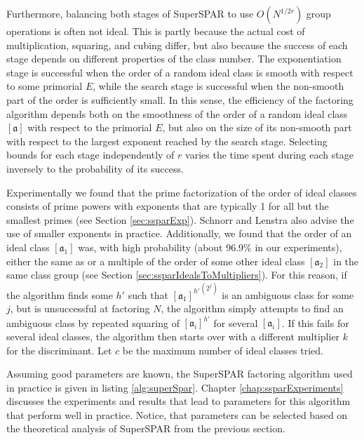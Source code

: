 \documentclass{ucalgthes1}
\theoremstyle{definition}
\newcommand{\aclass}{[\mathfrak a]}
\begin{document}
Furthermore, balancing both stages of SuperSPAR to use $O(N^{1/2r})$ group operations is often not ideal.  This is partly because the actual cost of multiplication, squaring, and cubing differ, but also because the success of each stage depends on different properties of the class number.  The exponentiation stage is successful when the order of a random ideal class is smooth with respect to some primorial $E$, while the search stage is successful when the non-smooth part of the order is sufficiently small.  In this sense, the efficiency of the factoring algorithm depends both on the smoothness of the order of a random ideal class $\aclass$ with respect to the primorial $E$, but also on the size of its non-smooth part with respect to the largest exponent reached by the search stage.  Selecting bounds for each stage independently of $r$ varies the time spent during each stage inversely to the probability of its success.

Experimentally we found that the prime factorization of the order of ideal classes consists of prime powers with exponents that are typically 1 for all but the smallest primes (see Section \ref{sec:ssparExp}).  Schnorr and Lenstra \cite[p.293]{Schnorr1984} also advise the use of smaller exponents in practice.  Additionally, we found that the order of an ideal class $[\mathfrak a_1]$ was, with high probability (about 96.9\% in our experiments), either the same as or a multiple of the order of some other ideal class $[\mathfrak a_2]$ in the same class group (see Section \ref{sec:ssparIdealsToMultipliers}).  For this reason, if the algorithm finds some $h'$ such that ${[\mathfrak a_1]^{h'}}^{\left(2^j\right)}$ is an ambiguous class for some $j$, but is unsuccessful at factoring $N$, the algorithm simply attempts to find an ambiguous class by repeated squaring of $[\mathfrak a_i]^{h'}$ for several $[\mathfrak a_i]$.  If this fails for several ideal classes, the algorithm then starts over with a different multiplier $k$ for the discriminant.  Let $c$ be the maximum number of ideal classes tried.

Assuming good parameters are known, the SuperSPAR factoring algorithm used in practice is given in listing \ref{alg:superSpar}.  Chapter \ref{chap:ssparExperiments} discusses the experiments and results that lead to parameters for this algorithm that perform well in practice.  Notice, that parameters can be selected based on the theoretical analysis of SuperSPAR from the previous section.

\end{document}
